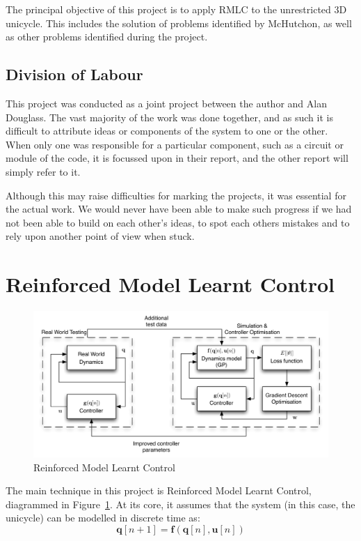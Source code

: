 \documentclass{IIBproject}
\begin{document}
The principal objective of this project is to apply RMLC to the unrestricted
3D unicycle. This includes the solution of problems identified by McHutchon,
as well as other problems identified during the project.

\subsection{Division of Labour}

This project was conducted as a joint project between the author and Alan
Douglass. The vast majority of the work was done together, and as such it is
difficult to attribute ideas or components of the system to one or the other.
When only one was responsible for a particular component, such as a circuit or
module of the code, it is focussed upon in their report, and the other report
will simply refer to it.

Although this may raise difficulties for marking the projects, it was
essential for the actual work. We would never have been able to make such
progress if we had not been able to build on each other's ideas, to spot each
others mistakes and to rely upon another point of view when stuck.

\section{Reinforced Model Learnt Control}

\begin{figure}[htbp]
  \begin{center}
    \includegraphics[width=14cm]{figures/GPRMLC.pdf}
    \end{center}
    \caption{Reinforced Model Learnt Control}
    \label{fig:rmlc_flowchart}
    \end{figure}

The main technique in this project is Reinforced Model Learnt Control,
diagrammed in Figure~\ref{fig:rmlc_flowchart}. At its core, it assumes that
the system (in this case, the unicycle) can be modelled in discrete time as:
\[
  \boldsymbol{q}[n+1] = \boldsymbol{f}(\boldsymbol{q}[n],
  \boldsymbol{u}[n])
\]
\end{document}
